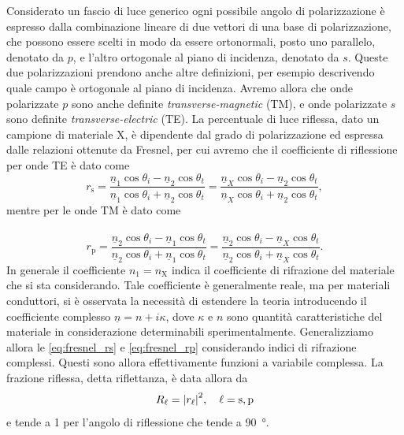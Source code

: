 \documentclass[
    prb,altaffilletter,citeautoscript,
    amsmath,amssymb,
    showpacs,showkeys,floatfix,
    reprint
]{revtex4-1}
\begin{document}
Considerato un fascio di luce generico ogni possibile angolo di polarizzazione è espresso dalla combinazione lineare di due vettori di una base di polarizzazione, che possono essere scelti in modo da essere ortonormali, posto uno parallelo, denotato da $p$, e l'altro ortogonale al piano di incidenza, denotato da $s$. Queste due polarizzazioni prendono anche altre definizioni, per esempio descrivendo quale campo è ortogonale al piano di incidenza. Avremo allora che onde polarizzate $p$ sono anche definite \emph{transverse-magnetic} (TM), e onde polarizzate $s$ sono definite \emph{transverse-electric} (TE). La percentuale di luce riflessa, dato un campione di materiale X, è dipendente dal grado di polarizzazione ed espressa dalle relazioni ottenute da Fresnel\cite{fresnelCalculationTintsThat2021,fresnelNoteCalculTeintes1821}, per cui avremo che il coefficiente di riflessione per onde TE è dato come \begin{equation}
    r_\mathrm{s} = \frac{\underline{n}_1\cos\theta_i - \underline{n}_2\cos\theta_t}{\underline{n}_1\cos\theta_i + \underline{n}_2\cos\theta_t} = \frac{\underline{n}_X\cos\theta_i - \underline{n}_2\cos\theta_t}{\underline{n}_X\cos\theta_i + \underline{n}_2\cos\theta_t},
    \label{eq:fresnel_rs}
\end{equation} mentre per le onde TM è dato come \paragraph*{}\begin{equation}
    r_\mathrm{p} = \frac{\underline{n}_2\cos\theta_i - \underline{n}_1\cos\theta_t}{\underline{n}_2\cos\theta_i + \underline{n}_1\cos\theta_t} = \frac{\underline{n}_2\cos\theta_i - \underline{n}_X\cos\theta_t}{\underline{n}_2\cos\theta_i + \underline{n}_X\cos\theta_t}. 
    \label{eq:fresnel_rp}
\end{equation} In generale il coefficiente $n_1=n_\mathrm{X}$ indica il coefficiente di rifrazione del materiale che si sta considerando. Tale coefficiente è generalmente reale, ma per materiali conduttori, si è osservata la necessità di estendere la teoria\cite{attwoodSoftXRaysExtreme1999} introducendo il coefficiente complesso $\underline n = n + i\kappa$, dove $\kappa$ e $n$ sono quantità caratteristiche del materiale in considerazione determinabili sperimentalmente. Generalizziamo allora le \eqref{eq:fresnel_rs} e \eqref{eq:fresnel_rp} considerando indici di rifrazione complessi. Questi sono allora effettivamente funzioni a variabile complessa. La frazione riflessa, detta riflettanza, è data allora da \begin{equation}
    R_\ell= \qty|r_\ell|^2, \quad \ell = \mathrm{s,p} \label{eq:R}
\end{equation} e tende a 1 per l'angolo di riflessione che tende a \SI{90}{\degree}.
\end{document}
